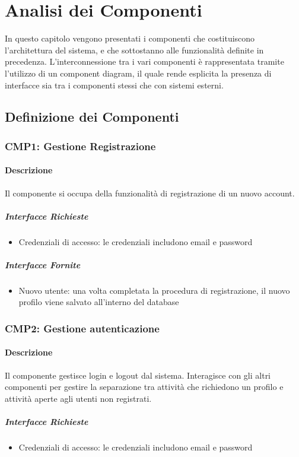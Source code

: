 \documentclass[9pt]{extarticle}
\begin{document}
\newpage
\section{Analisi dei Componenti}

In questo capitolo vengono presentati i componenti che costituiscono l'architettura del sistema, e che sottostanno alle funzionalità definite in precedenza. L'interconnessione tra i vari componenti è rappresentata tramite l'utilizzo di un component diagram, il quale rende esplicita la presenza di interfacce sia tra i componenti  stessi che con sistemi esterni.

\subsection{Definizione dei Componenti}

\subsubsection*{CMP1: Gestione Registrazione}
\paragraph{Descrizione}
Il componente si occupa della funzionalità di registrazione di un nuovo account.

\subparagraph{Interfacce Richieste}
\begin{itemize}
	\item Credenziali di accesso: le credenziali includono email e password
\end{itemize}

\subparagraph{Interfacce Fornite}
\begin{itemize}
	\item Nuovo utente: una volta completata la procedura di registrazione, il nuovo profilo viene salvato all'interno del database
\end{itemize}


\subsubsection*{CMP2: Gestione autenticazione}
\paragraph{Descrizione}
Il componente gestisce login e logout dal sistema. Interagisce con gli altri componenti per gestire la separazione tra attività che richiedono un profilo e attività aperte agli utenti non registrati.
\subparagraph{Interfacce Richieste}
\begin{itemize}
	\item Credenziali di accesso: le credenziali includono email e password
\end{itemize}
\end{document}
